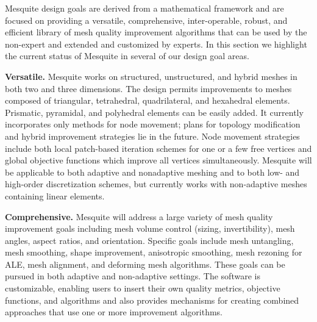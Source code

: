 Mesquite design goals are derived from a mathematical framework and
are focused on providing a versatile, comprehensive, inter-operable,
robust, and efficient library of mesh quality improvement algorithms
that can be used by the non-expert and extended and customized by
experts.  In this section we highlight the current status of Mesquite
in several of our design goal areas. \newline


{\bf Versatile.}  Mesquite works on structured, unstructured, and
hybrid meshes in both two and three dimensions. The design permits
improvements to meshes composed of triangular, tetrahedral,
quadrilateral, and hexahedral elements. Prismatic, pyramidal, and
polyhedral elements can be easily added.  It currently incorporates
only methods for node movement; plans for topology modification and
hybrid improvement strategies lie in the future.  Node movement
strategies include both local patch-based iteration schemes for one or
a few free vertices and global objective functions which improve all
vertices simultaneously. Mesquite will be applicable to both adaptive
and nonadaptive meshing and to both low- and high-order discretization
schemes, but currently works with non-adaptive meshes containing
linear elements. \newline

{\bf Comprehensive.}  Mesquite will address a large variety of mesh
quality improvement goals including mesh volume control (sizing,
invertibility), mesh angles, aspect ratios, and orientation. Specific
goals include mesh untangling, mesh smoothing, shape improvement,
anisotropic smoothing, mesh rezoning for ALE, mesh alignment, and
deforming mesh algorithms. These goals can be pursued in both adaptive
and non-adaptive settings. The software is customizable, enabling
users to insert their own quality metrics, objective functions, and
algorithms and also provides mechanisms for creating combined
approaches that use one or more improvement algorithms. \newline


